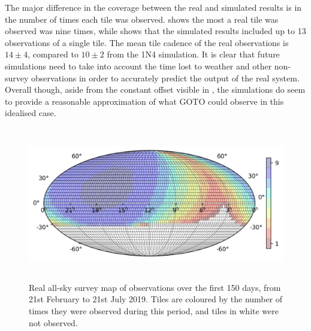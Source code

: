 \begin{colsection}
The major difference in the coverage between the real and simulated results is in the number of times each tile was observed.  shows the most a real tile was observed was nine times, while  shows that the simulated results included up to 13 observations of a single tile. The mean tile cadence of the real observations is $14\pm4$, compared to $10\pm2$ from the 1N4 simulation. It is clear that future simulations need to take into account the time lost to weather and other non-survey observations in order to accurately predict the output of the real system. Overall though, aside from the constant offset visible in , the simulations do seem to provide a reasonable approximation of what GOTO could observe in this idealised case.

\begin{figure}[p]
    \begin{center}
        \includegraphics[height=190pt]{images/survey_sims/150_1N4_real.png}
    \end{center}
    \caption[Real survey observations over 150 days]{
        Real all-sky survey map of observations over the first 150 days, from 21st February to 21st July 2019. Tiles are coloured by the number of times they were observed during this period, and tiles in white were not observed.
    }\label{fig:survey_real_150}
\end{figure}


\end{colsection}

